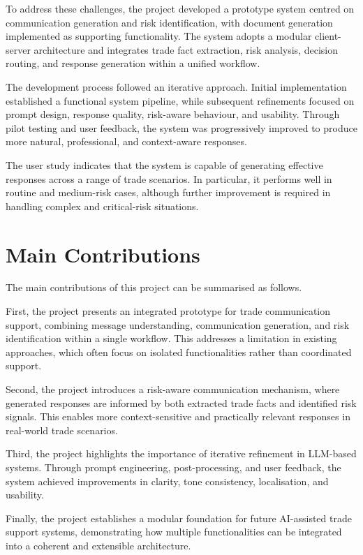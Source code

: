 \documentclass[12pt,a4paper]{report}
\begin{document}
To address these challenges, the project developed a prototype system centred on communication generation and risk identification, with document generation implemented as supporting functionality. The system adopts a modular client-server architecture and integrates trade fact extraction, risk analysis, decision routing, and response generation within a unified workflow.

The development process followed an iterative approach. Initial implementation established a functional system pipeline, while subsequent refinements focused on prompt design, response quality, risk-aware behaviour, and usability. Through pilot testing and user feedback, the system was progressively improved to produce more natural, professional, and context-aware responses.

The user study indicates that the system is capable of generating effective responses across a range of trade scenarios. In particular, it performs well in routine and medium-risk cases, although further improvement is required in handling complex and critical-risk situations.

\section{Main Contributions}

The main contributions of this project can be summarised as follows.

First, the project presents an integrated prototype for trade communication support, combining message understanding, communication generation, and risk identification within a single workflow. This addresses a limitation in existing approaches, which often focus on isolated functionalities rather than coordinated support.

Second, the project introduces a risk-aware communication mechanism, where generated responses are informed by both extracted trade facts and identified risk signals. This enables more context-sensitive and practically relevant responses in real-world trade scenarios.

Third, the project highlights the importance of iterative refinement in LLM-based systems. Through prompt engineering, post-processing, and user feedback, the system achieved improvements in clarity, tone consistency, localisation, and usability.

Finally, the project establishes a modular foundation for future AI-assisted trade support systems, demonstrating how multiple functionalities can be integrated into a coherent and extensible architecture.
\end{document}
